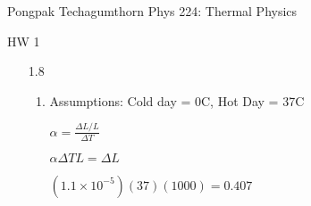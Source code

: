 \documentclass{article}
\begin{document}
\large %
{\Large Pongpak Techagumthorn
\hfill Phys 224: Thermal Physics}
\begin{center}
{\Large
HW 1
}
\end{center}
\vspace{0.1in}
\begin{enumerate}
    \item [1.8]
    \begin{enumerate}
        \item Assumptions: Cold day = 0\degree C, Hot Day = 37\degree C
            
            $\alpha = \frac{\Delta L/L}{\Delta T}$
            
            $\alpha \Delta T L = \Delta L$
            
            $(1.1\times 10^{-5})(37)(1000)=0.407$
    \end{enumerate}
    \vspace{0.1in}

\end{enumerate}
\end{document}
